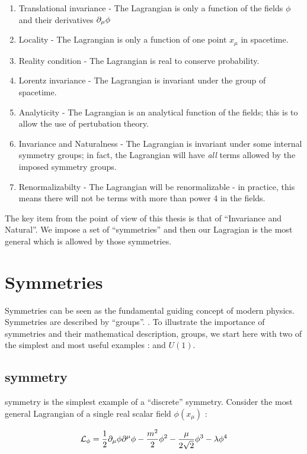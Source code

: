 \begin{enumerate}
\item Translational invariance - The Lagrangian is only a function of the fields $\phi$ and their derivatives $\partial_\mu \phi$
\item Locality - The Lagrangian is only a function of one point $x_\mu$ in spacetime.
\item Reality condition - The Lagrangian is real to conserve probability.
\item Lorentz invariance - The Lagrangian is invariant under the \Poincare group of spacetime.
\item Analyticity - The Lagrangian is an analytical function of the fields; this is to allow the use of pertubation theory.
\item Invariance and Naturalness - The Lagrangian is invariant under some internal symmetry groups; in fact, the Lagrangian will have \textit{all} terms allowed by the imposed symmetry groups. 
\item Renormalizabilty - The Lagrangian will be renormalizable - in practice, this means there will not be terms with more than power 4 in the fields.
\end{enumerate}

The key item from the point of view of this thesis is that of ``Invariance and Natural''.
We impose a set of ``symmetries'' and then our Lagragian is the most general which is allowed by those symmetries.

\section{Symmetries}

Symmetries can be seen as the fundamental guiding concept of modern physics.
Symmetries are described by ``groups''. .
To illustrate the importance of symmetries and their mathematical description, groups, we start here with two of the simplest and most useful examples :  \Ztwo and $U(1)$.

\subsection{\Ztwo symmetry}

\Ztwo symmetry is the simplest example of a ``discrete'' symmetry.
Consider the most general Lagrangian of a single real scalar field $\phi(x_\mu)$ :

\begin{equation} \label{scalarFieldLagrangian}
\mathcal{L}_\phi = \frac{1}{2} \partial_\mu \phi \partial^\mu \phi - \frac{m^2}{2} \phi^2 - \frac{\mu}{2 \sqrt{2}}  \phi^3 - \lambda \phi^4
\end{equation}

